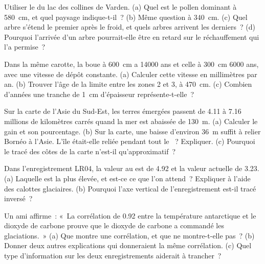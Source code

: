 \begin{exercise}[$\star\star$]\label{exo:g12:past-climates:7}
Utiliser le  du lac des collines de Varden. (a) Quel
est le pollen dominant à \qty{580}{cm}, et quel paysage indique-t-il~?
(b) Même question à \qty{340}{cm}. (c) Quel arbre s'étend le premier après
le froid, et quels arbres arrivent les derniers~? (d) Pourquoi l'arrivée
d'un arbre pourrait-elle être en retard sur le réchauffement qui l'a
permise~?
\end{exercise}

\begin{exercise}[$\star\star$]\label{exo:g12:past-climates:8}
Dans la même carotte, la boue à \qty{600}{cm} a \num{14000} ans et celle à
\qty{300}{cm} \num{6000} ans, avec une vitesse de dépôt constante.
(a) Calculer cette vitesse en millimètres par an. (b) Trouver l'âge de la
limite entre les zones 2 et 3, à \qty{470}{cm}. (c) Combien d'années une
tranche de \qty{1}{cm} d'épaisseur représente-t-elle~?
\end{exercise}

\begin{exercise}[$\star\star$]\label{exo:g12:past-climates:9}
Sur la carte de l'Asie du Sud-Est, les terres émergées passent de 4.11 à
7.16 millions de kilomètres carrés quand la mer est abaissée de
\qty{130}{m}. (a) Calculer le gain et son pourcentage. (b) Sur la carte,
une baisse d'environ \qty{36}{m} suffit à relier Bornéo à l'Asie. L'île
était-elle reliée pendant tout le ~? Expliquer.
(c) Pourquoi le tracé des côtes de la carte n'est-il qu'approximatif~?
\end{exercise}

\begin{exercise}[$\star\star$]\label{exo:g12:past-climates:10}
Dans l'enregistrement LR04, la valeur au  est de
\qty{4.92}{\permil} et la valeur actuelle de \qty{3.23}{\permil}.
(a) Laquelle est la plus élevée, et est-ce ce que l'on attend~? Expliquer
à l'aide des calottes glaciaires. (b) Pourquoi l'axe vertical de
l'enregistrement est-il tracé inversé~?
\end{exercise}

\begin{exercise}[$\star\star$]\label{exo:g12:past-climates:11}
Un ami affirme~: «~La corrélation de 0.92 entre la température antarctique
et le dioxyde de carbone prouve que le dioxyde de carbone a commandé les
glaciations.~» (a) Que montre une corrélation, et que ne montre-t-elle
pas~? (b) Donner deux autres explications qui donneraient la même
corrélation. (c) Quel type d'information sur les deux enregistrements
aiderait à trancher~?
\end{exercise}

